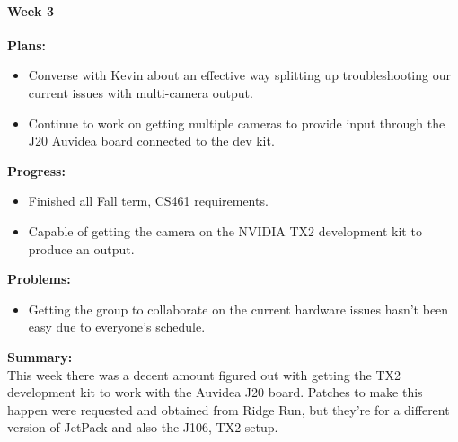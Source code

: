 \paragraph{Week 3}
\begin{adjustwidth}{2.5em}{0pt}
    \vspace{-0.5cm}\textbf{Plans:}
    \vspace{-0.5cm}
    \begin{itemize}
        \item Converse with Kevin about an effective way splitting up troubleshooting our current issues with multi-camera output.
    	\item Continue to work on getting multiple cameras to provide input through the J20 Auvidea board connected to the dev kit. 
    \end{itemize} 
    \vspace{-0.3cm}\textbf{Progress:}
    \vspace{-0.5cm}
    \begin{itemize}
        \item Finished all Fall term, CS461 requirements.
		\item Capable of getting the camera on the NVIDIA TX2 development kit to produce an output.  
    \end{itemize} 
    \vspace{-0.3cm}\textbf{Problems:}
    \vspace{-0.5cm}
    \begin{itemize}
        \item Getting the group to collaborate on the current hardware issues hasn't been easy due to everyone's schedule. 
    \end{itemize}  
    \vspace{-0.3cm}\noindent\textbf{Summary:}\\
    \noindent This week there was a decent amount figured out with getting the TX2 development kit to work with the Auvidea J20 board. Patches to make this happen were requested and obtained from Ridge Run, but they're for a different version of JetPack and also the J106, TX2 setup. 
\end{adjustwidth} 

